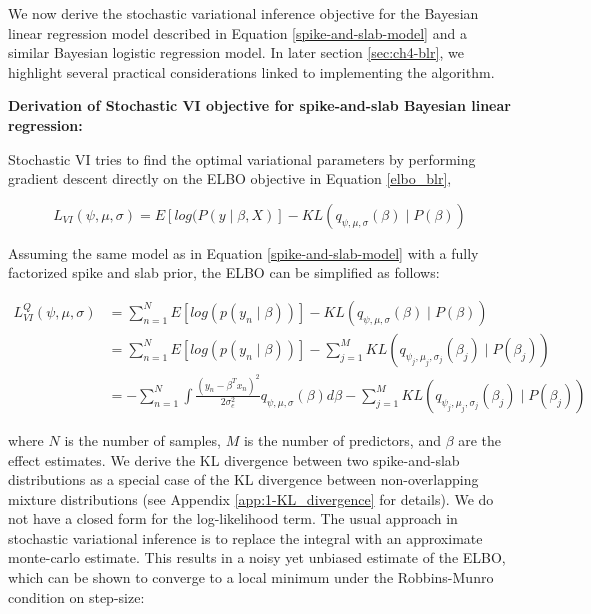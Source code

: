 %
We now derive the stochastic variational inference objective for the Bayesian linear regression model described in Equation \ref{spike-and-slab-model} and a similar Bayesian logistic regression model.
%
In later section \ref{sec:ch4-blr}, we highlight several practical considerations linked to implementing the algorithm.
%

\vspace{3mm}
\noindent \textbf{Derivation of Stochastic VI objective for spike-and-slab Bayesian linear regression:}
\vspace{2mm} 
%

%
Stochastic VI tries to find the optimal variational parameters by performing gradient descent directly on the ELBO objective in Equation \ref{elbo_blr},
%

\begin{equation}
    L_{VI}(\psi, \mu, \sigma) = E[log(P( y \mid \beta,X)] - KL(q_{\psi, \mu, \sigma}(\beta) \mid P(\beta))
\end{equation}

%
Assuming the same model as in Equation \ref{spike-and-slab-model} with a fully factorized spike and slab prior, the ELBO can be simplified as follows:

\begin{align}
 L^{Q}_{VI}(\psi, \mu, \sigma) &= \sum\limits^{N}_{n=1} E[log(p(y_{n} \mid \beta))] - KL(q_{\psi, \mu, \sigma}(\beta) \mid P(\beta)) \nonumber \\
 &= \sum\limits^{N}_{n=1} E[log(p(y_{n} \mid \beta))] - \sum\limits^{M}_{j=1} KL(q_{\psi_j, \mu_j, \sigma_j}(\beta_j) \mid P(\beta_j)) \nonumber \\
 &= - \sum\limits^{N}_{n=1} \int \frac{(y_n - \beta^T x_n)^2}{2 \sigma_e^2} q_{\psi, \mu, \sigma}(\beta) d\beta - \sum\limits^{M}_{j=1} KL(q_{\psi_j, \mu_j, \sigma_j}(\beta_j) \mid P(\beta_j)) \label{spike-and-slab-1}
\end{align}

where $N$ is the number of samples, $M$ is the number of predictors, and $\beta$ are the effect estimates.
%
We derive the KL divergence between two spike-and-slab distributions as a special case of the KL divergence between non-overlapping mixture distributions (see Appendix \ref{app:1-KL_divergence} for details).
%
We do not have a closed form for the log-likelihood term.
%
The usual approach in stochastic variational inference is to replace the integral with an approximate monte-carlo estimate.
%
This results in a noisy yet unbiased estimate of the ELBO, which can be shown to converge to a local minimum under the Robbins-Munro condition \cite{robbins1951stochastic} on step-size:

